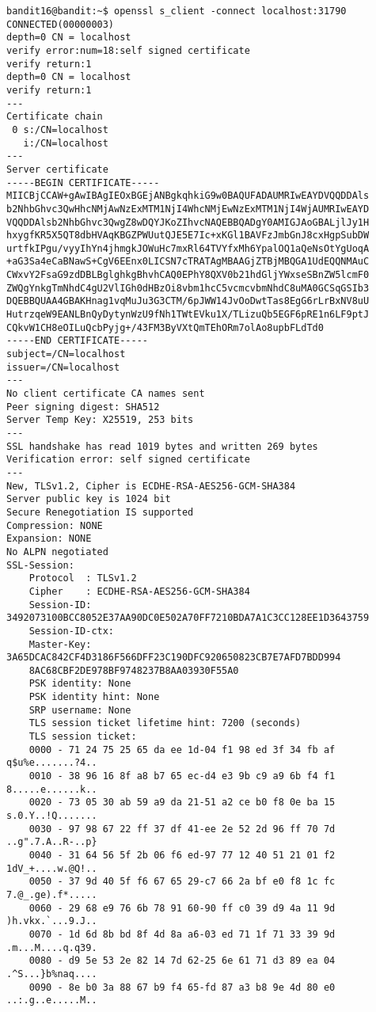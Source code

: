 \documentclass[a4paper]{report}
\begin{document}
\begin{verbatim}
bandit16@bandit:~$ openssl s_client -connect localhost:31790
CONNECTED(00000003)
depth=0 CN = localhost
verify error:num=18:self signed certificate
verify return:1
depth=0 CN = localhost
verify return:1
---
Certificate chain
 0 s:/CN=localhost
   i:/CN=localhost
---
Server certificate
-----BEGIN CERTIFICATE-----
MIICBjCCAW+gAwIBAgIEOxBGEjANBgkqhkiG9w0BAQUFADAUMRIwEAYDVQQDDAls
b2NhbGhvc3QwHhcNMjAwNzExMTM1NjI4WhcNMjEwNzExMTM1NjI4WjAUMRIwEAYD
VQQDDAlsb2NhbGhvc3QwgZ8wDQYJKoZIhvcNAQEBBQADgY0AMIGJAoGBALjlJy1H
hxygfKR5X5QT8dbHVAqKBGZPWUutQJE5E7Ic+xKGl1BAVFzJmbGnJ8cxHgpSubDW
urtfkIPgu/vyyIhYn4jhmgkJOWuHc7mxRl64TVYfxMh6YpalOQ1aQeNsOtYgUoqA
+aG3Sa4eCaBNawS+CgV6EEnx0LICSN7cTRATAgMBAAGjZTBjMBQGA1UdEQQNMAuC
CWxvY2FsaG9zdDBLBglghkgBhvhCAQ0EPhY8QXV0b21hdGljYWxseSBnZW5lcmF0
ZWQgYnkgTmNhdC4gU2VlIGh0dHBzOi8vbm1hcC5vcmcvbmNhdC8uMA0GCSqGSIb3
DQEBBQUAA4GBAKHnag1vqMuJu3G3CTM/6pJWW14JvOoDwtTas8EgG6rLrBxNV8uU
HutrzqeW9EANLBnQyDytynWzU9fNh1TWtEVku1X/TLizuQb5EGF6pRE1n6LF9ptJ
CQkvW1CH8eOILuQcbPyjg+/43FM3ByVXtQmTEhORm7olAo8upbFLdTd0
-----END CERTIFICATE-----
subject=/CN=localhost
issuer=/CN=localhost
---
No client certificate CA names sent
Peer signing digest: SHA512
Server Temp Key: X25519, 253 bits
---
SSL handshake has read 1019 bytes and written 269 bytes
Verification error: self signed certificate
---
New, TLSv1.2, Cipher is ECDHE-RSA-AES256-GCM-SHA384
Server public key is 1024 bit
Secure Renegotiation IS supported
Compression: NONE
Expansion: NONE
No ALPN negotiated
SSL-Session:
    Protocol  : TLSv1.2
    Cipher    : ECDHE-RSA-AES256-GCM-SHA384
    Session-ID: 3492073100BCC8052E37AA90DC0E502A70FF7210BDA7A1C3CC128EE1D3643759
    Session-ID-ctx: 
    Master-Key: 3A65DCAC842CF4D3186F566DFF23C190DFC920650823CB7E7AFD7BDD994
    8AC68CBF2DE978BF9748237B8AA03930F55A0
    PSK identity: None
    PSK identity hint: None
    SRP username: None
    TLS session ticket lifetime hint: 7200 (seconds)
    TLS session ticket:
    0000 - 71 24 75 25 65 da ee 1d-04 f1 98 ed 3f 34 fb af   q$u%e.......?4..
    0010 - 38 96 16 8f a8 b7 65 ec-d4 e3 9b c9 a9 6b f4 f1   8.....e......k..
    0020 - 73 05 30 ab 59 a9 da 21-51 a2 ce b0 f8 0e ba 15   s.0.Y..!Q.......
    0030 - 97 98 67 22 ff 37 df 41-ee 2e 52 2d 96 ff 70 7d   ..g".7.A..R-..p}
    0040 - 31 64 56 5f 2b 06 f6 ed-97 77 12 40 51 21 01 f2   1dV_+....w.@Q!..
    0050 - 37 9d 40 5f f6 67 65 29-c7 66 2a bf e0 f8 1c fc   7.@_.ge).f*.....
    0060 - 29 68 e9 76 6b 78 91 60-90 ff c0 39 d9 4a 11 9d   )h.vkx.`...9.J..
    0070 - 1d 6d 8b bd 8f 4d 8a a6-03 ed 71 1f 71 33 39 9d   .m...M....q.q39.
    0080 - d9 5e 53 2e 82 14 7d 62-25 6e 61 71 d3 89 ea 04   .^S...}b%naq....
    0090 - 8e b0 3a 88 67 b9 f4 65-fd 87 a3 b8 9e 4d 80 e0   ..:.g..e.....M..


\end{verbatim}
\end{document}
